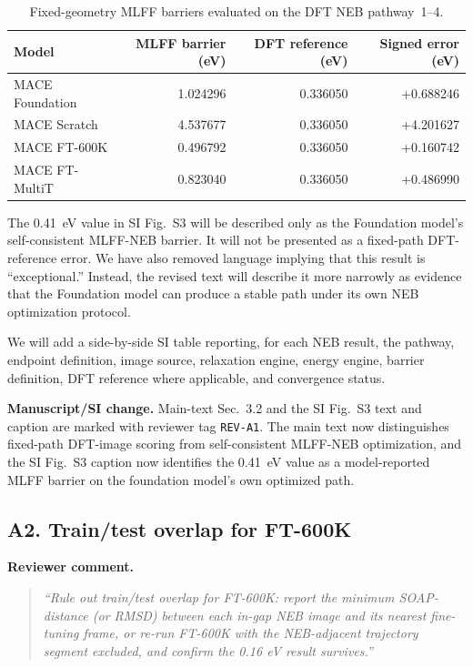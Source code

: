 \documentclass[11pt,a4paper]{article}
\begin{document}
\begin{table}[h]
\centering
\caption{Fixed-geometry MLFF barriers evaluated on the DFT NEB pathway~1--4.}
\begin{tabular}{lrrr}
\toprule
Model & MLFF barrier (eV) & DFT reference (eV) & Signed error (eV) \\
\midrule
MACE Foundation & 1.024296 & 0.336050 & +0.688246 \\
MACE Scratch & 4.537677 & 0.336050 & +4.201627 \\
MACE FT-600K & 0.496792 & 0.336050 & +0.160742 \\
MACE FT-MultiT & 0.823040 & 0.336050 & +0.486990 \\
\bottomrule
\end{tabular}
\end{table}

The 0.41~eV value in SI Fig.~S3 will be described only as the Foundation model's self-consistent MLFF-NEB barrier. It will not be presented as a fixed-path DFT-reference error. We have also removed language implying that this result is ``exceptional.'' Instead, the revised text will describe it more narrowly as evidence that the Foundation model can produce a stable path under its own NEB optimization protocol.

We will add a side-by-side SI table reporting, for each NEB result, the pathway, endpoint definition, image source, relaxation engine, energy engine, barrier definition, DFT reference where applicable, and convergence status.

\noindent\textbf{Manuscript/SI change.}
Main-text Sec.~3.2 and the SI Fig.~S3 text and caption are marked with reviewer tag \texttt{REV-A1}. The main text now distinguishes fixed-path DFT-image scoring from self-consistent MLFF-NEB optimization, and the SI Fig.~S3 caption now identifies the 0.41~eV value as a model-reported MLFF barrier on the foundation model's own optimized path.

\subsection*{A2. Train/test overlap for FT-600K}

\noindent\textbf{Reviewer comment.}
\begin{quote}
\itshape
``Rule out train/test overlap for FT-600K: report the minimum SOAP-distance (or RMSD) between each in-gap NEB image and its nearest fine-tuning frame, or re-run FT-600K with the NEB-adjacent trajectory segment excluded, and confirm the 0.16 eV result survives.''
\end{quote}
\end{document}
